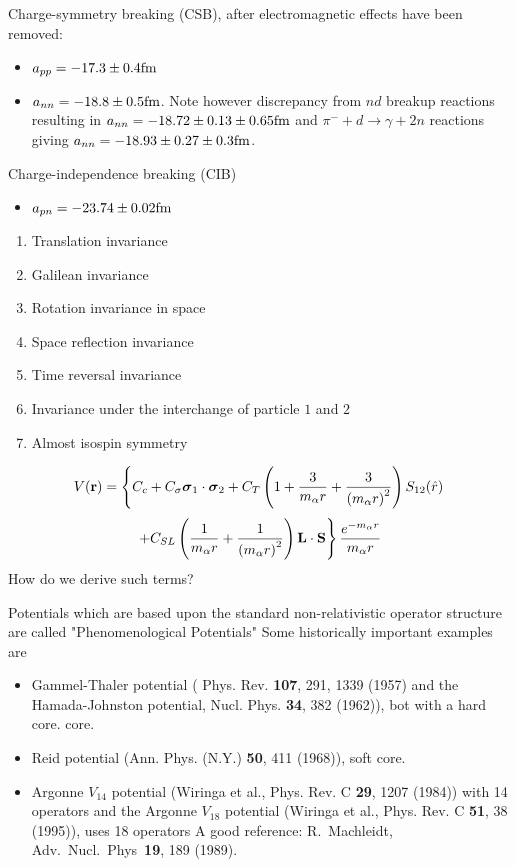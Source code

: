 \begin{enumerate}
Charge-symmetry breaking (CSB), after electromagnetic effects
have been removed:
\begin{itemize}
\item $a_{pp}=  -17.3 \pm 0.4 \hspace{0.cm} \mathrm{fm}$
\item $a_{nn}=-18.8 \pm 0.5 \hspace{0.cm} \mathrm{fm}$. Note however discrepancy from $nd$ breakup reactions
resulting in  $a_{nn}=-18.72 \pm 0.13 \pm 0.65 \hspace{0.cm} \mathrm{fm}$
and $\pi^- + d \rightarrow \gamma + 2n$ reactions giving  $a_{nn}=-18.93 \pm 0.27 \pm 0.3 \hspace{0.cm} \mathrm{fm}$.
\end{itemize}
Charge-independence breaking (CIB)
\begin{itemize}
\item $a_{pn}=  -23.74 \pm 0.02 \hspace{0.cm} \mathrm{fm}$ 
\end{itemize}
\begin{enumerate}
\item Translation invariance
\item Galilean invariance
\item  Rotation invariance in space
\item Space reflection invariance
\item Time reversal invariance
\item Invariance under the interchange of particle $1$ and $2$
\item Almost isospin symmetry
\end{enumerate}
\[
V({\bf r})= \left\{ C_c + C_\sigma 
\mbox{\boldmath $\sigma$}_1\cdot\mbox{\boldmath $\sigma$}_2
 + C_T \left( 1 + {3\over m_\alpha r} + {3\over
\left(m_\alpha r\right)^2}\right) S_{12} (\hat r)\right. 
\]
\[
\left. + C_{SL} \left( {1\over m_\alpha r} + {1\over \left( m_\alpha r\right)^2}
\right) {\bf L}\cdot {\bf S}
\right\} \frac{e^{-m_\alpha r}}{m_\alpha r}
\]
How do we derive such terms?  

 Potentials which are based upon the standard non-relativistic operator structure
 are called "Phenomenological Potentials"
Some historically important examples are   
    \begin{itemize}
   \item    Gammel-Thaler potential ( Phys. Rev. {\bf 107}, 291, 1339 (1957) and the 
 Hamada-Johnston potential, Nucl. Phys. {\bf 34}, 382 (1962)), bot with a hard core.
    core.
   \item  Reid potential (Ann. Phys. (N.Y.) {\bf 50}, 411 (1968)), soft core.
\item
Argonne $V_{14}$ potential (Wiringa et al., Phys. Rev. C {\bf 29}, 1207
    (1984)) with 14 operators and  the  Argonne $V_{18}$ potential (Wiringa et al., Phys. Rev. C {\bf 51}, 38
    (1995)), uses 18 operators
  A good reference: R.~Machleidt, Adv.~Nucl.~Phys~{\bf 19}, 189 (1989).
\end{itemize}


\end{enumerate}
